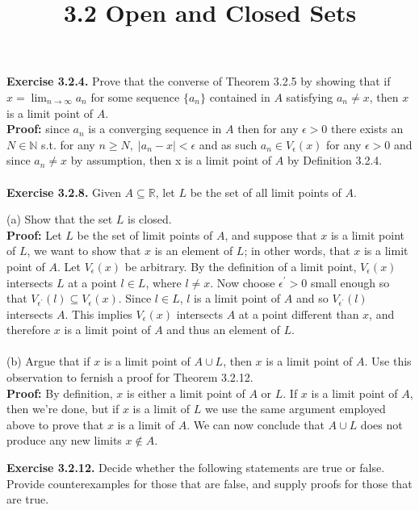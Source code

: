 \documentclass{article}
\title{\textbf{3.2 Open and Closed Sets}}
\begin{document}
\maketitle
\textbf{Exercise 3.2.4.} Prove that the converse of Theorem 3.2.5 by showing that if $x = \lim_{n \to \infty}a_n$ for some sequence $\{ a_n \}$ contained in $A$ satisfying $a_n \neq x$, then $x$ is a limit point of $A$.  \\
\textbf{Proof:} since $a_n$ is a converging sequence in $A$ then for any $\epsilon > 0$ there exists an $N \in \mathbb{N}$ s.t. for any $n \geq N, \; |a_n - x| < \epsilon$ and as such $a_n \in V_\epsilon(x)$ for any $\epsilon > 0$ and since $a_n \neq x$ by assumption, then x is a limit point of $A$ by Definition 3.2.4. \\ \\
\textbf{Exercise 3.2.8.} Given $A \subseteq \mathbb{R}$, let $L$ be the set of all limit points of $A$. 
\begin{itemize}
	(a) Show that the set $L$ is closed. \\
	\textbf{Proof:} Let $L$ be the set of limit points of $A$, and suppose that $x$ is a limit point of $L$, we want to show that $x$ is an element of $L$; in other words, that $x$ is a limit point of $A$. Let $V_\epsilon(x)$ be arbitrary. By the definition of a limit point, $V_\epsilon(x)$ intersects $L$ at a point $l \in L$, where $l \neq x$. Now choose $\epsilon^{'} > 0$ small enough so that $V_{\epsilon^{'}}(l) \subseteq V_\epsilon(x)$. Since $l \in L$, $l$ is a limit point of $A$ and so $V_{\epsilon^{'}}(l)$ intersects $A$. This implies $V_\epsilon(x)$ intersects $A$ at a point different than $x$, and therefore $x$ is a limit point of $A$ and thus an element of $L$.\\ \\
	(b) Argue that if $x$ is a limit point of $A \cup L$, then $x$ is a limit point of $A$. Use this observation to fernish a proof for Theorem 3.2.12. \\
	\textbf{Proof:} By definition, $x$ is either a limit point of $A$ or $L$. If $x$ is a limit point of $A$, then we're done, but if $x$ is a limit of $L$ we use the same argument employed above to prove that $x$ is a limit of $A$. We can now conclude that $A \cup L$ does not produce any new limits $x \notin A$. \\
\end{itemize}
\textbf{Exercise 3.2.12.} Decide whether the following statements are true or false. \\
Provide counterexamples for those that are false, and supply proofs for those that are true. \\
\end{document}
